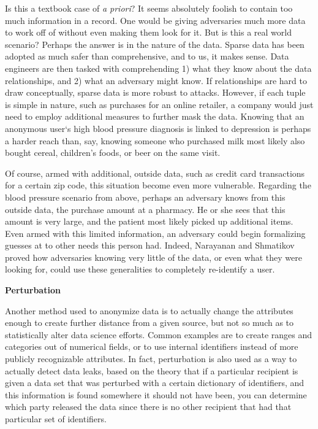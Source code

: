 \documentclass[10pt,journal,compsoc]{IEEEtran}
\begin{document}
	Is this a textbook case of \textit{a priori}?  It seems absolutely foolish to contain too much information in a record.  One would be giving adversaries much more data to work off of without even making them look for it. But is this a real world scenario? Perhaps the answer is in the nature of the data.  Sparse data has been adopted as much safer than comprehensive, and to us, it makes sense.  Data engineers are then tasked with comprehending 1) what they know about the data relationships, and 2) what an adversary might know.  If relationships are hard to draw conceptually, sparse data is more robust to attacks.  However, if each tuple is simple in nature, such as purchases for an online retailer, a company would just need to employ additional measures to further mask the data.  Knowing that an anonymous user`s high blood pressure diagnosis is linked to depression is perhaps a harder reach than, say, knowing someone who purchased milk most likely also bought cereal, children’s foods, or beer on the same visit.
	  
	Of course, armed with additional, outside data, such as credit card transactions for a certain zip code, this situation become even more vulnerable.  Regarding the blood pressure scenario from above, perhaps an adversary knows from this outside data, the purchase amount at a pharmacy.  He or she sees that this amount is very large, and the patient most likely picked up additional items.  Even armed with this limited information, an adversary could begin formalizing guesses at to other needs this person had.  Indeed, Narayanan and Shmatikov proved how adversaries knowing very little of the data, or even what they were looking for, could use these generalities to completely re-identify a user\cite{narayanan}.
\linebreak
	
\noindent \textbf{Perturbation}

	Another method used to anonymize data is to actually change the attributes enough to create further distance from a given source, but not so much as to statistically alter data science efforts.  Common examples are to create ranges and categories out of numerical fields, or to use internal identifiers instead of more publicly recognizable attributes.  In fact, perturbation is also used as a way to actually detect data leaks,  based on the theory that if a particular recipient is given a data set that was perturbed with a certain dictionary of identifiers, and this information is found somewhere it should not have been, you can determine which party released the data since there is no other recipient that had that particular set of identifiers.
	
\end{document}
